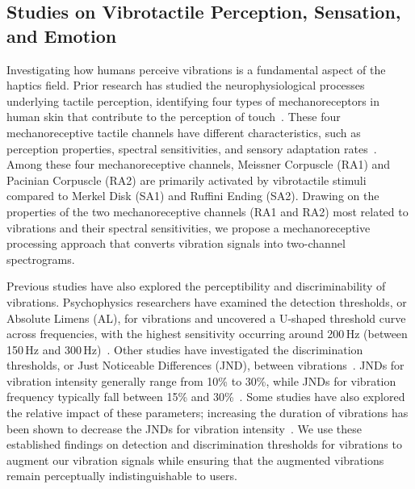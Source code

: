 \subsection{Studies on Vibrotactile Perception, Sensation, and Emotion}

Investigating how humans perceive vibrations is a fundamental aspect of the haptics field.
Prior research has studied the neurophysiological processes underlying tactile perception, identifying four types of mechanoreceptors in human skin that contribute to the perception of touch~\cite{goldstein1989sensation}.
These four mechanoreceptive tactile channels have different characteristics, such as perception properties, spectral sensitivities, and sensory adaptation rates~\cite{kandel2000principles, choi2012vibrotactile}.
Among these four mechanoreceptive channels, Meissner Corpuscle (RA1) and Pacinian Corpuscle (RA2) are primarily activated by vibrotactile stimuli compared to Merkel Disk (SA1) and Ruffini Ending (SA2).
Drawing on the properties of the two mechanoreceptive channels (RA1 and RA2) most related to vibrations and their spectral sensitivities, we propose a mechanoreceptive processing approach that converts vibration signals into two-channel spectrograms.


Previous studies have also explored the perceptibility and discriminability of vibrations.
Psychophysics researchers have examined the detection thresholds, or Absolute Limens (AL), for vibrations and uncovered a U-shaped threshold curve across frequencies, with the highest sensitivity occurring around 200\,Hz (between 150\,Hz and 300\,Hz)~\cite{gescheider2013psychophysics, ryu2010psychophysical}.
Other studies have investigated the discrimination thresholds, or Just Noticeable Differences (JND), between vibrations~\cite{israr2006frequency, franzen1975vibrotactile, goble1994vibrotactile, goff1967differential}.
JNDs for vibration intensity generally range from 10\% to 30\%, while JNDs for vibration frequency typically fall between 15\% and 30\%~\cite{choi2012vibrotactile}.
Some studies have also explored the relative impact of these parameters; increasing the duration of vibrations has been shown to decrease the JNDs for vibration intensity~\cite{gescheider1996effects, jones2006human}.
We use these established findings on detection and discrimination thresholds for vibrations to augment our vibration signals while ensuring that the augmented vibrations remain perceptually indistinguishable to users.


